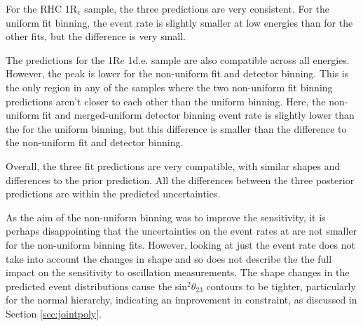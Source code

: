 For the RHC 1R$_e$ sample, the three predictions are very consistent. For the uniform fit binning, the event rate is slightly smaller at low energies than for the other fits, but the difference is very small.

The predictions for the 1R$e$ 1d.e. sample are also compatible across all energies. However, the peak is lower for the non-uniform fit and detector binning. This is the only region in any of the samples where the two non-uniform fit binning predictions aren't closer to each other than the uniform binning. Here, the non-uniform fit and merged-uniform detector binning event rate is slightly lower than the for the uniform binning, but this difference is smaller than the difference to the non-uniform fit and detector binning. 

Overall, the three fit predictions are very compatible, with similar shapes and differences to the prior prediction. All the differences between the three posterior predictions are within the predicted uncertainties.

As the aim of the non-uniform binning was to improve the sensitivity, it is perhaps disappointing that the uncertainties on the event rates at \SK are not smaller for the non-uniform binning fits. However, looking at just the event rate does not take into account the changes in shape and so does not describe the the full impact on the sensitivity to oscillation measurements. The shape changes in the predicted event distributions cause the sin$^2\theta_{23}$ contours to be tighter, particularly for the normal hierarchy, indicating an improvement in constraint, as discussed in Section \ref{sec:jointpoly}. 

